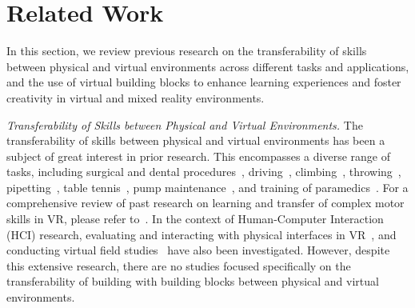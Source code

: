 \section{Related Work}
In this section, we review previous research on the transferability of skills between physical and virtual environments across different tasks and applications, and the use of virtual building blocks to enhance learning experiences and foster creativity in virtual and mixed reality environments.

\textit{Transferability of Skills between Physical and Virtual Environments.}
The transferability of skills between physical and virtual environments has been a subject of great interest in prior research. 
This encompasses a diverse range of tasks, including surgical and dental procedures~\cite{Ayoub2019application}, driving~\cite{Risto2014}, climbing~\cite{Kosmalla2017}, throwing~\cite{tirp2015virtual, Zindulka2020, Kelling2023}, pipetting~\cite{petersen2022pipetting}, table tennis~\cite{Oagaz2022}, pump maintenance~\cite{Winther2020}, and training of paramedics~\cite{schild2018epicsave}.
For a comprehensive review of past research on learning and transfer of complex motor skills in VR, please refer to~\cite{Levac2019}.
In the context of Human-Computer Interaction (HCI) research, evaluating and interacting with physical interfaces in VR~\cite{Paneva2020}, and conducting virtual field studies~\cite{Maekelae2020} have also been investigated. 
However, despite this extensive research, there are no studies focused specifically on the transferability of building with building blocks between physical and virtual environments.

